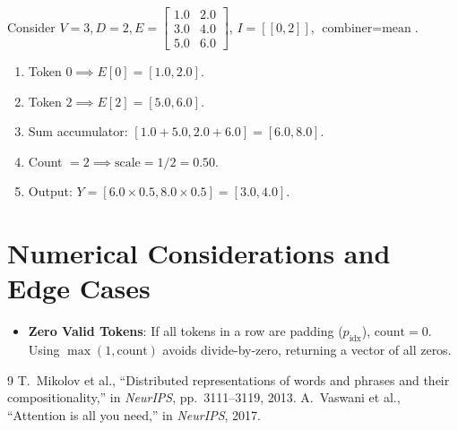 \documentclass[11pt,a4paper]{article}
\theoremstyle{definition}
\begin{document}
Consider $V=3, D=2, E = \begin{bmatrix} 1.0 & 2.0 \\ 3.0 & 4.0 \\ 5.0 & 6.0 \end{bmatrix}$, $I = [[0, 2]]$, $\text{combiner} = \text{mean}$.

\begin{enumerate}
    \item Token $0 \implies E[0] = [1.0, 2.0]$.
    \item Token $2 \implies E[2] = [5.0, 6.0]$.
    \item Sum accumulator: $[1.0 + 5.0, 2.0 + 6.0] = [6.0, 8.0]$.
    \item Count $= 2 \implies \text{scale} = 1/2 = 0.50$.
    \item Output: $Y = [6.0 \times 0.5, 8.0 \times 0.5] = [3.0, 4.0]$.
\end{enumerate}

\section{Numerical Considerations and Edge Cases}

\begin{itemize}
    \item \textbf{Zero Valid Tokens}: If all tokens in a row are padding ($p_{\text{idx}}$), $\text{count} = 0$. Using $\max(1, \text{count})$ avoids divide-by-zero, returning a vector of all zeros.
\end{itemize}

\begin{thebibliography}{9}
 T.~Mikolov et al., ``Distributed representations of words and phrases and their compositionality,'' in \emph{NeurIPS}, pp.~3111--3119, 2013.
 A.~Vaswani et al., ``Attention is all you need,'' in \emph{NeurIPS}, 2017.
\end{thebibliography}
\end{document}
